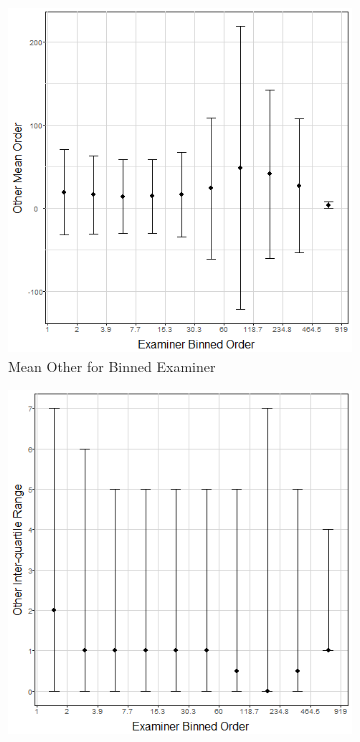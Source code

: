 \begin{figure}
\begin{subfigure}{.24\linewidth}
  \centering
  \includegraphics[width=0.9\linewidth]{Figures/MeanOtherVsExaminer}
 \caption[]{\small Mean Other for Binned Examiner\newline}
\label{fig:MeanOtherVsExaminer}
\end{subfigure}%
\begin{subfigure}{.24\linewidth}
  \centering
  \includegraphics[width=0.9\linewidth]{Figures/MedianOtherVsExaminer}

\end{subfigure}
\end{figure}
